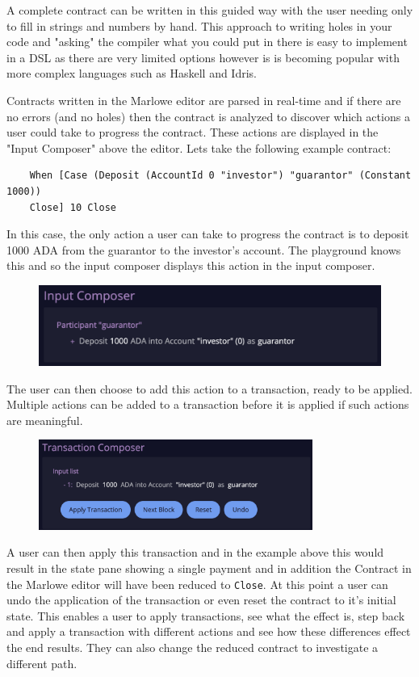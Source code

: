 \documentclass[runningheads]{llncs}
\begin{document}
A complete contract can be written in this guided way with the user needing only to fill in strings and numbers by hand. This approach to writing holes in your code and "asking" the compiler what you could put in there is easy to implement in a DSL as there are very limited options however is is becoming popular with more complex languages such as Haskell and Idris.

Contracts written in the Marlowe editor are parsed in real-time and if there are no errors (and no holes) then the contract is analyzed to discover which actions a user could take to progress the contract. These actions are displayed in the "Input Composer" above the editor. Lets take the following example contract:
\begin{verbatim}
    When [Case (Deposit (AccountId 0 "investor") "guarantor" (Constant 1000)) 
    Close] 10 Close
\end{verbatim}
In this case, the only action a user can take to progress the contract is to deposit 1000 ADA from the guarantor to the investor's account. The playground knows this and so the input composer displays this action in the input composer.

\begin{figure}[]
    \includegraphics[width=1\textwidth]{input_composer.png}
\end{figure}
The user can then choose to add this action to a transaction, ready to be applied. Multiple actions can be added to a transaction before it is applied if such actions are meaningful.

\begin{figure}[]
    \includegraphics[width=0.8\textwidth]{tx_composer.png}
\end{figure}
A user can then apply this transaction and in the example above this would result in the state pane showing a single payment and in addition the Contract in the Marlowe editor will have been reduced to \lstinline{Close}. At this point a user can undo the application of the transaction or even reset the contract to it's initial state. This enables a user to apply transactions, see what the effect is, step back and apply a transaction with different actions and see how these differences effect the end results. They can also change the reduced contract to investigate a different path.
\end{document}
